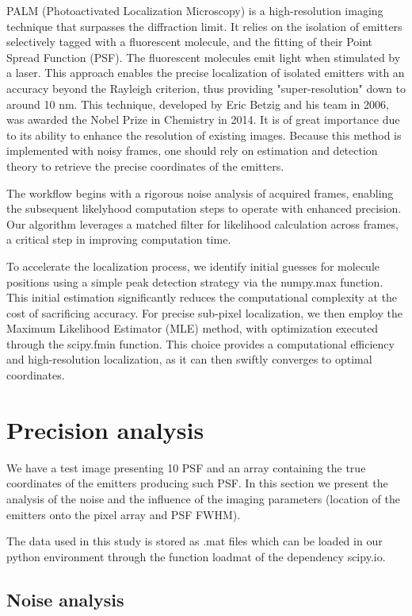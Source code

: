 \documentclass[10pt,letterpaper]{article}
\begin{document}
PALM (Photoactivated Localization Microscopy) is a high-resolution imaging technique that surpasses the diffraction limit. It relies on the isolation of emitters selectively tagged with a fluorescent molecule, and the fitting of their Point Spread Function (PSF). The fluorescent molecules emit light when stimulated by a laser. This approach enables the precise localization of isolated emitters with an accuracy beyond the Rayleigh criterion, thus providing "super-resolution" down to around 10 nm. This technique, developed by Eric Betzig and his team in 2006, was awarded the Nobel Prize in Chemistry in 2014. It is of great importance due to its ability to enhance the resolution of existing images. Because this method is implemented with noisy frames, one should rely on estimation and detection theory to retrieve the precise coordinates of the emitters.

The workflow begins with a rigorous noise analysis of acquired frames, enabling the subsequent likelyhood computation steps to operate with enhanced precision. Our algorithm leverages a matched filter for likelihood calculation across frames, a critical step in improving computation time.

To accelerate the localization process, we identify initial guesses for molecule positions using a simple peak detection strategy via the numpy.max function. This initial estimation significantly reduces the computational complexity at the cost of sacrificing accuracy. For precise sub-pixel localization, we then employ the Maximum Likelihood Estimator (MLE) method, with optimization executed through the scipy.fmin function. This choice provides a computational efficiency and high-resolution localization, as it can then swiftly converges to optimal coordinates.

\section{Precision analysis}
We have a test image presenting 10 PSF and an array containing the true coordinates of the emitters producing such PSF. In this section we present the analysis of the noise and the influence of the imaging parameters (location of the emitters onto the pixel array and PSF FWHM).

The data used in this study is stored as .mat files which can be loaded in our python environment through the function loadmat of the dependency scipy.io.

\subsection{Noise analysis}
\end{document}
